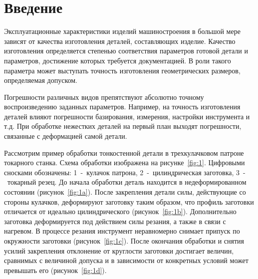 \documentclass[14pt,oneside,final]{extreport}
\begin{document}
	\renewcommand*\contentsname{\hfill Содержание \hfill}
	\tableofcontents
	
	\chapter{Введение}
	Эксплуатационные характеристики изделий машиностроения в большой мере зависят от качества изготовления деталей, составляющих изделие. Качество изготовления определяется степенью соответствия параметров готовой детали и параметров, достижение которых требуется документацией. В роли такого параметра может выступать точность изготовления геометрических размеров, определяемая допуском. 
	
	Погрешности различных видов препятствуют абсолютно точному воспроизведению заданных параметров. Например, на точность изготовления деталей влияют погрешности базирования, измерения, настройки инструмента и т.д. При обработке нежестких деталей на первый план выходят погрешности, связанные с деформацией самой детали.
	
	Рассмотрим пример обработки тонкостенной детали в трехкулачковом патроне токарного станка. Схема обработки изображена на рисунке~\ref{fig:1}. Цифровыми сносками обозначены: 1~-~кулачок патрона, 2~-~цилиндрическая заготовка, 3~-~токарный резец. До начала обработки деталь находится в недеформированном состоянии (рисунок~\ref{fig:1a}). После закрепления детали силы, действующие со стороны кулачков, деформируют заготовку таким образом, что профиль заготовки отличается от идеально цилиндрического (рисунок~\ref{fig:1b}). Дополнительно заготовка деформируется под действием силы резания, а также в связи с нагревом. В процессе резания инструмент неравномерно снимает припуск по окружности заготовки (рисунок~\ref{fig:1c}). После окончания обработки и снятия усилий закрепления отклонение от круглости заготовки достигает величин, сравнимых с величиной допуска и в зависимости от конкретных условий может превышать его (рисунок~\ref{fig:1d}).
	
\end{document}
